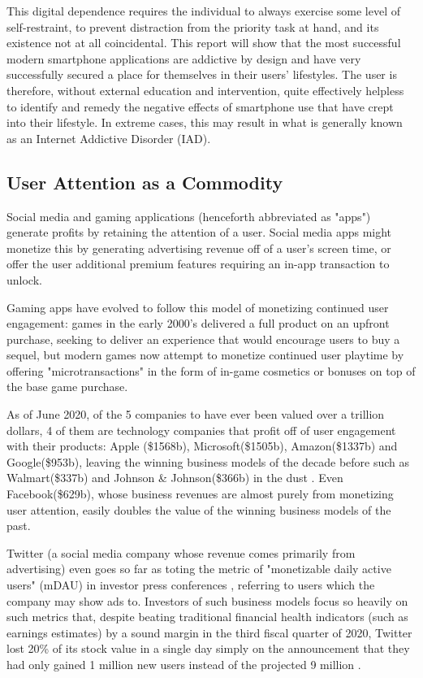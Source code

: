 This digital dependence requires the individual to always exercise some level of self-restraint, to prevent distraction from the priority task at hand, and its existence not at all coincidental. This report will show that the most successful modern smartphone applications are addictive by design and have very successfully secured a place for themselves in their users' lifestyles. The user is therefore, without external education and intervention, quite effectively helpless to identify and remedy the negative effects of smartphone use that have crept into their lifestyle. In extreme cases, this may result in what is generally known as an Internet Addictive Disorder (IAD).

\subsection{User Attention as a Commodity}
Social media and gaming applications (henceforth abbreviated as "apps") generate profits by retaining the attention of a user. Social media apps might monetize this by generating advertising revenue off of a user's screen time, or offer the user additional premium features requiring an in-app transaction to unlock.

Gaming apps have evolved to follow this model of monetizing continued user engagement: games in the early 2000's delivered a full product on an upfront purchase, seeking to deliver an experience that would encourage users to buy a sequel, but modern games now attempt to monetize continued user playtime by offering "microtransactions" in the form of in-game cosmetics or bonuses on top of the base game purchase.

As of June 2020, of the 5 companies to have ever been valued over a trillion dollars, 4 of them are technology companies that profit off of user engagement with their products: Apple (\$1568b), Microsoft(\$1505b), Amazon(\$1337b) and Google(\$953b), leaving the winning business models of the decade before such as Walmart(\$337b) and Johnson \& Johnson(\$366b) in the dust \cite{pwctop100}. Even Facebook(\$629b), whose business revenues are almost purely from monetizing user attention, easily doubles the value of the winning business models of the past.

Twitter (a social media company whose revenue comes primarily from advertising) even goes so far as toting the metric of "monetizable daily active users" (mDAU) in investor press conferences \cite{twtrTranscript}, referring to users which the company may show ads to. Investors of such business models focus so heavily on such metrics that, despite beating traditional financial health indicators (such as earnings estimates) by a sound margin in the third fiscal quarter of 2020, Twitter lost 20\% of its stock value in a single day simply on the announcement that they had only gained 1 million new users instead of the projected 9 million \cite{twtrLoss} \cite{twtrTranscript}.

